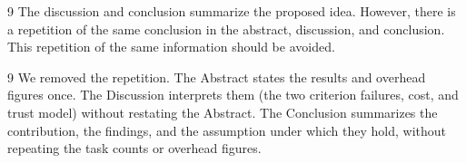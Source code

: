\begin{reviewcomment}{9}
	The discussion and conclusion summarize the proposed idea. However, there is a repetition of the same conclusion in the abstract, discussion, and conclusion. This repetition of the same information should be avoided.
\end{reviewcomment}

\begin{reviewresponse}{9}
	We removed the repetition.
	The Abstract states the results and overhead figures once.
	The Discussion interprets them (the two criterion failures, cost, and trust model) without restating the Abstract.
	The Conclusion summarizes the contribution, the findings, and the assumption under which they hold, without repeating the task counts or overhead figures.

\end{reviewresponse}
